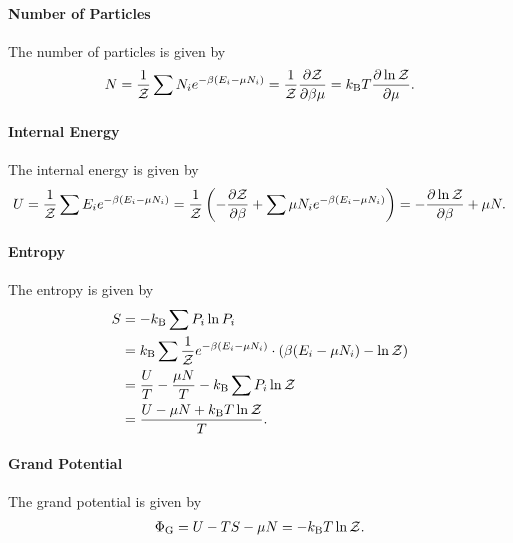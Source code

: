 \paragraph{Number of Particles}
The number of particles is given by
\begin{align*}
	N = \frac{1}{\mathcal{Z}}\sum N_{i}e^{-\beta(E_{i} - \mu N_{i})} = \frac{1}{\mathcal{Z}}\pdv{\mathcal{Z}}{\beta\mu} = k_{\text{B}} T\pdv{\ln{\mathcal{Z}}}{\mu}.
\end{align*}

\paragraph{Internal Energy}
The internal energy is given by
\begin{align*}
	U = \frac{1}{\mathcal{Z}}\sum E_{i}e^{-\beta(E_{i} - \mu N_{i})} = \frac{1}{\mathcal{Z}}\left(-\pdv{\mathcal{Z}}{\beta} + \sum\mu N_{i}e^{-\beta(E_{i} - \mu N_{i})}\right) = -\pdv{\ln{\mathcal{Z}}}{\beta} + \mu N.
\end{align*}

\paragraph{Entropy}
The entropy is given by
\begin{align*}
	S &= -k_{\text{B}}\sum P_{i}\ln{P_{i}} \\
	  &= k_{\text{B}}\sum \frac{1}{\mathcal{Z}}e^{-\beta(E_{i} - \mu N_{i})}\cdot\left(\beta(E_{i} - \mu N_{i}) - \ln{\mathcal{Z}}\right) \\
	  &= \frac{U}{T} - \frac{\mu N}{T} - k_{\text{B}}\sum P_{i}\ln{\mathcal{Z}} \\
	  &= \frac{U - \mu N + k_{\text{B}} T\ln{\mathcal{Z}}}{T}.
\end{align*}

\paragraph{Grand Potential}
The grand potential is given by
\begin{align*}
	\Phi_{\text{G}} = U - TS - \mu N = -k_{\text{B}} T\ln{\mathcal{Z}}.
\end{align*}


